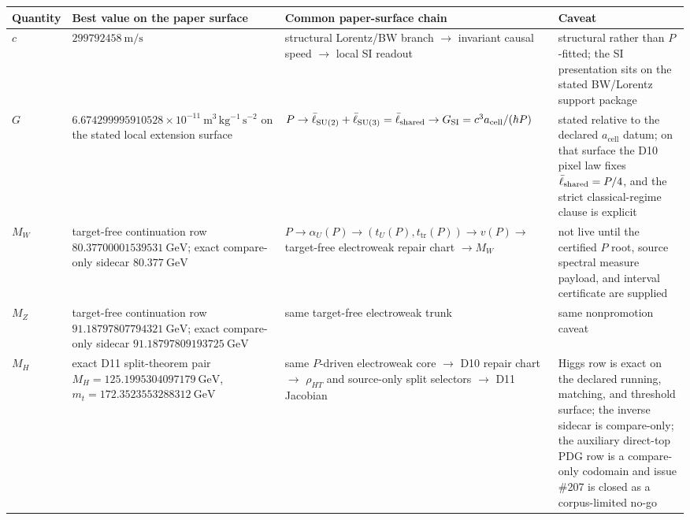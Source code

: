 {\centering
\scriptsize
\setlength{\tabcolsep}{3pt}
\begin{tabular}{@{}>{\raggedright\arraybackslash}p{}>{\raggedright\arraybackslash}p{}>{\raggedright\arraybackslash}p{}>{\raggedright\arraybackslash}p{}@{}}
\toprule
Quantity & Best value on the paper surface & Common paper-surface chain & Caveat \\
\midrule
\(c\) & \(299792458~\mathrm{m/s}\) & structural Lorentz/BW branch \(\rightarrow\) invariant causal speed \(\rightarrow\) local SI readout & structural rather than \(P\)-fitted; the SI presentation sits on the stated BW/Lorentz support package \\
\(G\) & \(6.674299995910528\times10^{-11}~\mathrm{m^3\,kg^{-1}\,s^{-2}}\) on the stated local extension surface & \(P \rightarrow \bar{\ell}_{\mathrm{SU(2)}}+\bar{\ell}_{\mathrm{SU(3)}} = \bar{\ell}_{\mathrm{shared}} \rightarrow G_{\mathrm{SI}} = c^3 a_{\mathrm{cell}}/(\hbar P)\) & stated relative to the declared \(a_{\mathrm{cell}}\) datum; on that surface the D10 pixel law fixes \(\bar{\ell}_{\mathrm{shared}}=P/4\), and the strict classical-regime clause is explicit \\
\(M_W\) & target-free continuation row \(80.37700001539531~\mathrm{GeV}\); exact compare-only sidecar \(80.377~\mathrm{GeV}\) & \(P \rightarrow \alpha_U(P) \rightarrow (t_U(P),t_{\mathrm{tr}}(P)) \rightarrow v(P) \rightarrow\) target-free electroweak repair chart \(\rightarrow M_W\) & not live until the certified \(P\) root, source spectral measure payload, and interval certificate are supplied \\
\(M_Z\) & target-free continuation row \(91.18797807794321~\mathrm{GeV}\); exact compare-only sidecar \(91.18797809193725~\mathrm{GeV}\) & same target-free electroweak trunk & same nonpromotion caveat \\
\(M_H\) & exact D11 split-theorem pair \(M_H=125.1995304097179~\mathrm{GeV}\), \(m_t=172.3523553288312~\mathrm{GeV}\) & same \(P\)-driven electroweak core \(\rightarrow\) D10 repair chart \(\rightarrow\) \(\rho_{HT}\) and source-only split selectors \(\rightarrow\) D11 Jacobian & Higgs row is exact on the declared running, matching, and threshold surface; the inverse sidecar is compare-only; the auxiliary direct-top PDG row is a compare-only codomain and issue \#207 is closed as a corpus-limited no-go \\
\bottomrule
\end{tabular}
\par}

